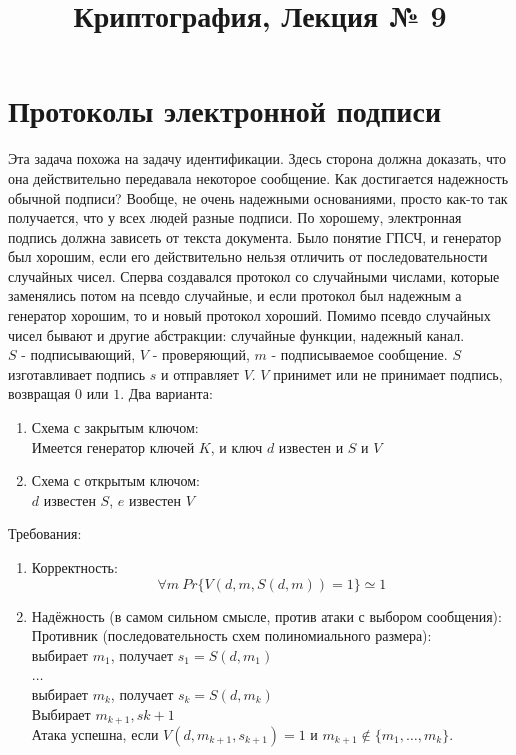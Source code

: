\documentclass[a4paper]{article}
\title{Криптография, Лекция № 9}
\theoremstyle{definition}
\theoremstyle{plain}
\begin{document}
\maketitle

\section{Протоколы электронной подписи}

Эта задача похожа на задачу идентификации. Здесь сторона должна
доказать, что она действительно передавала некоторое сообщение.
Как достигается надежность обычной подписи? Вообще, не очень надежными основаниями, просто
как-то так получается, что у всех людей разные подписи.
По хорошему, электронная подпись должна зависеть от текста документа.
Было понятие ГПСЧ, и генератор был хорошим, если его действительно нельзя отличить
от последовательности случайных чисел. Сперва создавался протокол со случайными числами,
которые заменялись потом на псевдо случайные, и если протокол был надежным а генератор хорошим,
то и новый протокол хороший.
Помимо псевдо случайных чисел бывают и другие абстракции: случайные функции, надежный канал.~\\

\noindent $S$ - подписывающий, $V$ - проверяющий,  $m$ - подписываемое сообщение.
$S$ изготавливает подпись $s$ и отправляет $V$.
$V$ принимет или не принимает подпись, возвращая $0$ или $1$.
Два варианта:
\begin{enumerate}
	\item Схема с закрытым ключом:~\\
		Имеется генератор ключей $K$, и ключ $d$ известен и $S$ и $V$
	\item Схема с открытым ключом:~\\
		$d$ известен $S$, $e$ известен $V$
\end{enumerate}

Требования:
\begin{enumerate}
	\item Корректность:
		$$
			\forall m\ Pr\{V(d, m, S(d, m)) = 1\} \simeq 1		
		$$
	\item Надёжность (в самом сильном смысле, против атаки с выбором сообщения):~\\
		Противник (последовательность схем полиномиального размера):~\\
		выбирает $m_1$, получает $s_1 = S(d, m_1)$~\\
		$\ldots $~\\
		выбирает $m_k$, получает $s_k = S(d, m_k)$~\\
		Выбирает $m_{k + 1}, s{k + 1}$~\\
		Атака успешна, если $V(d, m_{k + 1}, s_{k + 1}) = 1$ и $m_{k + 1} \notin \{m_1, \ldots, m_k\}$.
\end{enumerate}
\end{document}
